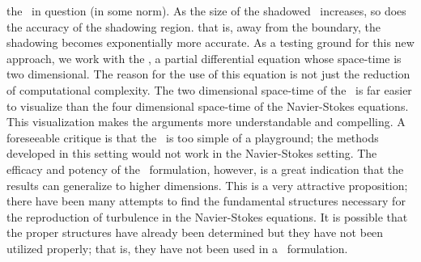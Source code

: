 the \twot\ in question (in some norm). As the size of the shadowed \twot\
increases, so does the accuracy of the shadowing region. that is, away from
the boundary, the shadowing becomes exponentially more accurate.
As a testing ground for this new approach, we work with the \KSe,
a partial differential equation whose space-time is two dimensional.
The reason for the use of this equation is not just the reduction
of computational complexity. The two
dimensional space-time of the \KSe\ is far easier to visualize than the four
dimensional space-time of the Navier-Stokes equations.
This visualization makes the arguments more
understandable and compelling. A foreseeable critique is
that the \KSe\ is too simple of a playground; the methods developed
in this setting would not work in the Navier-Stokes setting.
The efficacy and potency of the \spt\ formulation,
however, is a great indication that the results can generalize
to higher dimensions.
This is a very attractive proposition; there have been many attempts to
find the fundamental structures necessary for the reproduction
of turbulence in the Navier-Stokes equations.
It is possible that the proper structures have already been determined but they
have not been utilized properly; that is, they have not been used in a \spt\
formulation.

